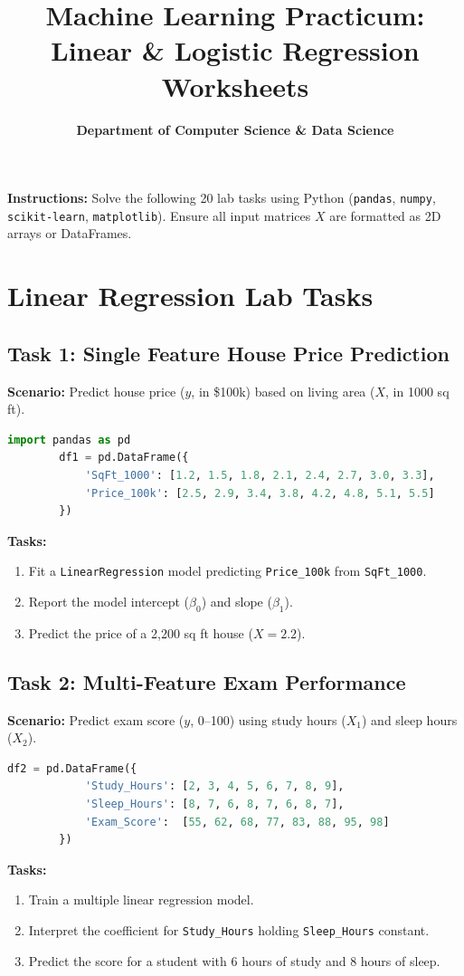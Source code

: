 \documentclass[11pt,a4paper]{article}
\title{\textbf{Machine Learning Practicum: Linear \& Logistic Regression Worksheets}}
\author{\textbf{Department of Computer Science \& Data Science}}
\date{}
\begin{document}
	
	\maketitle
	
	\noindent\textbf{Instructions:} Solve the following 20 lab tasks using Python (\texttt{pandas}, \texttt{numpy}, \texttt{scikit-learn}, \texttt{matplotlib}). Ensure all input matrices $X$ are formatted as 2D arrays or DataFrames.
	
	\vspace{0.5em}
	
	\section{Linear Regression Lab Tasks}
	
	\subsection{Task 1: Single Feature House Price Prediction}
	\textbf{Scenario:} Predict house price ($y$, in \$100k) based on living area ($X$, in 1000 sq ft).
	\begin{lstlisting}[language=Python]
		import pandas as pd
		df1 = pd.DataFrame({
			'SqFt_1000': [1.2, 1.5, 1.8, 2.1, 2.4, 2.7, 3.0, 3.3],
			'Price_100k': [2.5, 2.9, 3.4, 3.8, 4.2, 4.8, 5.1, 5.5]
		})
	\end{lstlisting}
	\textbf{Tasks:}
	\begin{enumerate}
		\item Fit a \texttt{LinearRegression} model predicting \texttt{Price\_100k} from \texttt{SqFt\_1000}.
		\item Report the model intercept ($\beta_0$) and slope ($\beta_1$).
		\item Predict the price of a 2,200 sq ft house ($X = 2.2$).
	\end{enumerate}
	
	\subsection{Task 2: Multi-Feature Exam Performance}
	\textbf{Scenario:} Predict exam score ($y$, 0--100) using study hours ($X_1$) and sleep hours ($X_2$).
	\begin{lstlisting}[language=Python]
		df2 = pd.DataFrame({
			'Study_Hours': [2, 3, 4, 5, 6, 7, 8, 9],
			'Sleep_Hours': [8, 7, 6, 8, 7, 6, 8, 7],
			'Exam_Score':  [55, 62, 68, 77, 83, 88, 95, 98]
		})
	\end{lstlisting}
	\textbf{Tasks:}
	\begin{enumerate}
		\item Train a multiple linear regression model.
		\item Interpret the coefficient for \texttt{Study\_Hours} holding \texttt{Sleep\_Hours} constant.
		\item Predict the score for a student with 6 hours of study and 8 hours of sleep.
	\end{enumerate}
	
\end{document}
